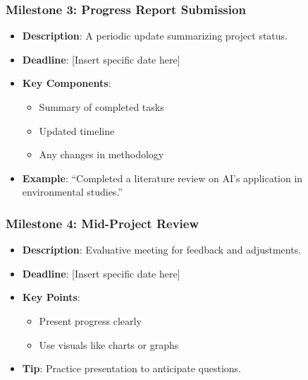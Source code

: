 \documentclass[aspectratio=169]{beamer}
\begin{document}
\begin{frame}[fragile]
    \frametitle{Milestone 3: Progress Report Submission}
    \begin{itemize}
        \item \textbf{Description}: A periodic update summarizing project status.
        \item \textbf{Deadline}: [Insert specific date here]
        \item \textbf{Key Components}:
        \begin{itemize}
            \item Summary of completed tasks
            \item Updated timeline
            \item Any changes in methodology
        \end{itemize}
        \item \textbf{Example}: “Completed a literature review on AI’s application in environmental studies.”
    \end{itemize}
\end{frame}

\begin{frame}[fragile]
    \frametitle{Milestone 4: Mid-Project Review}
    \begin{itemize}
        \item \textbf{Description}: Evaluative meeting for feedback and adjustments.
        \item \textbf{Deadline}: [Insert specific date here]
        \item \textbf{Key Points}:
        \begin{itemize}
            \item Present progress clearly
            \item Use visuals like charts or graphs
        \end{itemize}
        \item \textbf{Tip}: Practice presentation to anticipate questions.
    \end{itemize}
\end{frame}
\end{document}
